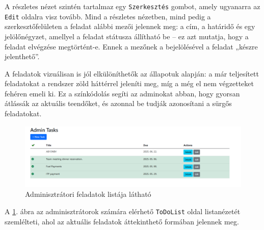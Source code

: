 A részletes nézet szintén tartalmaz egy \texttt{Szerkesztés} gombot, amely ugyanarra az \texttt{Edit} oldalra visz tovább. Mind a részletes nézetben, mind pedig a szerkesztőfelületen a feladat alábbi mezői jelennek meg: a cím, a határidő és egy jelölőnégyzet, amellyel a feladat státusza állítható be – ez azt mutatja, hogy a feladat elvégzése megtörtént-e. Ennek a mezőnek a bejelölésével a feladat „készre jelenthető”.

A feladatok vizuálisan is jól elkülöníthetők az állapotuk alapján: a már teljesített feladatokat a rendszer zöld háttérrel jeleníti meg, míg a még el nem végzetteket fehéren emeli ki. Ez a színkódolás segíti az adminokat abban, hogy gyorsan átlássák az aktuális teendőket, és azonnal be tudják azonosítani a sürgős feladatokat.


\begin{figure}[H]
\centering
\includegraphics[width=1\textwidth]{Szakdolgozat/Mellekletek/admintasks.PNG}
\caption{Adminisztrátori feladatok listája látható }
\label{fig:todo-admintask}
\end{figure}

A \ref{fig:todo-admintask}. ábra az adminisztrátorok számára elérhető \texttt{ToDoList} oldal listanézetét szemlélteti, ahol az aktuális feladatok áttekinthető formában jelennek meg.